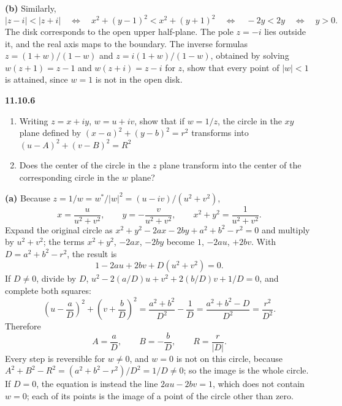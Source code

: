 \textbf{(b)} Similarly,
\[
|z-i|<|z+i|
\quad\Longleftrightarrow\quad
x^2+(y-1)^2<x^2+(y+1)^2
\quad\Longleftrightarrow\quad -2y<2y
\quad\Longleftrightarrow\quad y>0.
\]
The disk corresponds to the open upper half-plane. The pole $z=-i$
lies outside it, and the real axis maps to the boundary.
The inverse formulas
$z=(1+w)/(1-w)$ and $z=i(1+w)/(1-w)$, obtained by solving
$w(z+1)=z-1$ and $w(z+i)=z-i$ for $z$, show that every point of
$|w|<1$ is attained, since $w=1$ is not in the open disk.

\par\bigskip
\noindent\textbf{11.10.6}\quad
\begin{enumerate}
\item[(a)] Writing $z=x+iy$, $w=u+iv$, show that if $w=1/z$, the circle in
  the $xy$ plane defined by $(x-a)^{2}+(y-b)^{2}=r^{2}$ transforms into
  $(u-A)^{2}+(v-B)^{2}=R^{2}$ 
\item[(b)] Does the center of the circle in the $z$ plane transform into the
  center of the corresponding circle in the $w$ plane?
\end{enumerate}
\solution
{}

\textbf{(a)} Because $z=1/w=w^*/|w|^2=(u-iv)/(u^2+v^2)$,
\[
x=\frac{u}{u^2+v^2},\qquad
y=-\frac{v}{u^2+v^2},\qquad
x^2+y^2=\frac1{u^2+v^2}.
\]
Expand the original circle as
$x^2+y^2-2ax-2by+a^2+b^2-r^2=0$ and multiply by
$u^2+v^2$; the terms $x^2+y^2$, $-2ax$, $-2by$ become $1$, $-2au$,
$+2bv$. With $D=a^2+b^2-r^2$, the result is
\[
1-2au+2bv+D(u^2+v^2)=0.
\]
If $D\ne0$, divide by $D$,
$u^2-2(a/D)u+v^2+2(b/D)v+1/D=0$, and complete both squares:
\[
\left(u-\frac aD\right)^2+
\left(v+\frac bD\right)^2
=\frac{a^2+b^2}{D^2}-\frac1D
=\frac{a^2+b^2-D}{D^2}
=\frac{r^2}{D^2}.
\]
Therefore
\[
\boxed{A=\frac aD,\qquad B=-\frac bD,\qquad R=\frac r{|D|}}.
\]
Every step is reversible for $w\ne0$, and $w=0$ is not on this
circle, because $A^2+B^2-R^2=(a^2+b^2-r^2)/D^2=1/D\ne0$; so the image
is the whole circle.
If $D=0$, the equation is instead the line
$\boxed{2au-2bv=1}$, which does not contain $w=0$; each of its points
is the image of a point of the circle other than zero.

